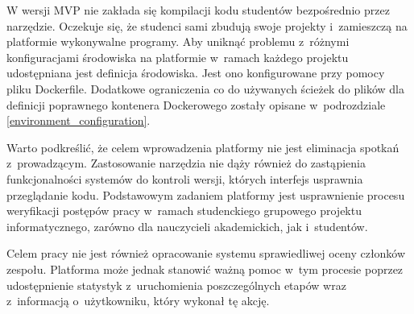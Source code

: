 W wersji MVP nie zakłada się kompilacji kodu studentów bezpośrednio przez narzędzie.
Oczekuje się, że studenci sami zbudują swoje projekty i~zamieszczą na platformie wykonywalne programy.
Aby uniknąć problemu z~różnymi konfiguracjami środowiska na platformie w~ramach każdego projektu udostępniana jest definicja środowiska.
Jest ono konfigurowane przy pomocy pliku Dockerfile.
Dodatkowe ograniczenia co do używanych ścieżek do plików dla definicji poprawnego kontenera Dockerowego zostały opisane w~podrozdziale \ref{environment_configuration}.

Warto podkreślić, że celem wprowadzenia platformy nie jest eliminacja spotkań z~prowadzącym.
Zastosowanie narzędzia nie dąży również do zastąpienia funkcjonalności systemów do kontroli wersji, których interfejs usprawnia przeglądanie kodu.
Podstawowym zadaniem platformy jest usprawnienie procesu weryfikacji postępów pracy w~ramach studenckiego grupowego projektu informatycznego, zarówno dla nauczycieli akademickich, jak i~studentów.

Celem pracy nie jest również opracowanie systemu sprawiedliwej oceny członków zespołu.
Platforma może jednak stanowić ważną pomoc w~tym procesie poprzez udostępnienie statystyk z~uruchomienia poszczególnych etapów wraz z~informacją o~użytkowniku, który wykonał tę akcję.



